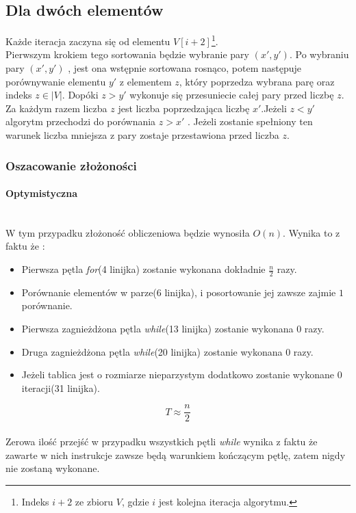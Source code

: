 \subsection{Dla dwóch elementów}
 Każde iteracja zaczyna się od elementu $V[i+2]$\footnote{Indeks $i+2$ ze zbioru $V$, gdzie $i$ jest kolejna iteracja algorytmu.}.\\
Pierwszym krokiem tego sortowania będzie wybranie  pary $(x',y')$. Po wybraniu pary $(x',y')$ , jest ona wstępnie sortowana rosnąco, potem następuje porównywanie elementu $y'$ z elementem $z$, który poprzedza wybrana parę oraz indeks $z \in \lvert V \rvert $. Dopóki  $z > y'$  wykonuje się przesuniecie całej pary przed liczbę $z$. Za każdym razem liczba $z$ jest liczba poprzedzająca liczbę $x'$.Jeżeli  $z < y'$ algorytm przechodzi do porównania $z > x'$ . Jeżeli zostanie spełniony ten warunek liczba mniejsza z pary zostaje przestawiona przed liczba $z$.
\subsubsection{Oszacowanie złożoności}
\paragraph{Optymistyczna}\mbox{}\\
W tym przypadku złożoność obliczeniowa będzie wynosiła $O(n)$.
Wynika to z faktu że :
\begin{itemize}
\item Pierwsza pętla \textit{for}(4 linijka) zostanie wykonana dokładnie $\frac{n}{2}$ razy.
\item Porównanie elementów w parze(6 linijka), i posortowanie jej zawsze zajmie $1$ porównanie.
\item Pierwsza zagnieżdżona pętla \textit{while}(13 linijka) zostanie wykonana $0$ razy.
\item Druga zagnieżdżona pętla \textit{while}(20 linijka) zostanie wykonana $0$ razy.
\item Jeżeli tablica jest o rozmiarze nieparzystym dodatkowo zostanie wykonane $0$ iteracji(31 linijka).
\end{itemize}
\begin{equation}
T \approx \frac{n}{2} 
\end{equation}
\wyjT \\
Zerowa ilość przejść w przypadku wszystkich pętli \textit{while} wynika z faktu że zawarte w nich instrukcje zawsze będą warunkiem kończącym pętlę, zatem nigdy nie zostaną wykonane.

